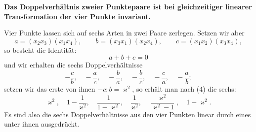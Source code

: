 \documentclass[11pt]{article}
\begin{document}
\begin{center}
\textbf{Das Doppelverhältnis zweier Punktepaare ist bei gleichzeitiger linearer Transformation der vier Punkte invariant.}
\end{center}

Vier Punkte lassen sich auf sechs Arten in zwei Paare zerlegen. Setzen wir aber
\[
a=(x_2x_3)(x_1x_4),\qquad b=(x_3x_1)(x_2x_4),\qquad c=(x_1x_2)(x_3x_4),
\]
so besteht die Identität:
\begin{equation}
a+b+c=0
\tag{4}
\end{equation}
und wir erhalten die sechs Doppelverhältnisse
\begin{equation}
-\frac{c}{b},\quad -\frac{a}{c},\quad -\frac{b}{a},\quad -\frac{b}{c},\quad -\frac{c}{a},\quad -\frac{a}{b};
\tag{5}
\end{equation}
setzen wir das erste von ihnen $-c:b=\varkappa^2$, so erhält man nach (4) die sechs:
\begin{equation}
\varkappa^2,\quad 1-\frac1{\varkappa^2},\quad \frac1{1-\varkappa^2},\quad \frac1{\varkappa^2},\quad \frac{\varkappa^2}{\varkappa^2-1},\quad 1-\varkappa^2.
\tag{6}
\end{equation}
Es sind also die sechs Doppelverhältnisse aus den vier Punkten linear durch eines unter ihnen ausgedrückt.
\end{document}
